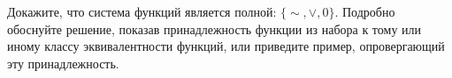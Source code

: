 \question
Докажите, что система функций является полной: $\{\sim, \vee, 0\}$. Подробно обоснуйте решение, показав  принадлежность функции из набора к тому или иному классу эквивалентности функций, или приведите пример, опровергающий эту принадлежность.

